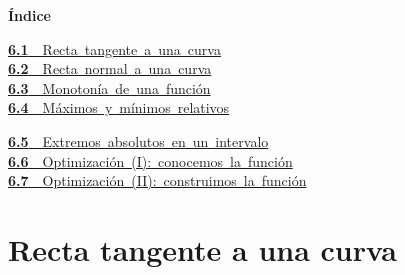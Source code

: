 \documentclass[11pt,a4paper]{article}
\begin{document}
\begin{tcolorbox}[colback=fmsurface,colframe=fmsurface,arc=3mm,left=4mm,right=4mm,top=2mm,bottom=2mm]
\small\textbf{Índice}\par\smallskip
\begin{minipage}[t]{0.49\linewidth}\small \mbox{\hyperlink{sec1}{\textbf{\color{fmgreen}6.1}\ \ Recta tangente a una curva}}\\[3pt]
\mbox{\hyperlink{sec2}{\textbf{\color{fmgreen}6.2}\ \ Recta normal a una curva}}\\[3pt]
\mbox{\hyperlink{sec3}{\textbf{\color{fmgreen}6.3}\ \ Monotonía de una función}}\\[3pt]
\mbox{\hyperlink{sec4}{\textbf{\color{fmgreen}6.4}\ \ Máximos y mínimos relativos}}\\[3pt]\end{minipage}\hfill\begin{minipage}[t]{0.49\linewidth}\small \mbox{\hyperlink{sec5}{\textbf{\color{fmgreen}6.5}\ \ Extremos absolutos en un intervalo}}\\[3pt]
\mbox{\hyperlink{sec6}{\textbf{\color{fmgreen}6.6}\ \ Optimización (I): conocemos la función}}\\[3pt]
\mbox{\hyperlink{sec7}{\textbf{\color{fmgreen}6.7}\ \ Optimización (II): construimos la función}}\\[3pt]\end{minipage}
\end{tcolorbox}

\section{Recta tangente a una curva}\hypertarget{sec1}{}

  
\end{document}
